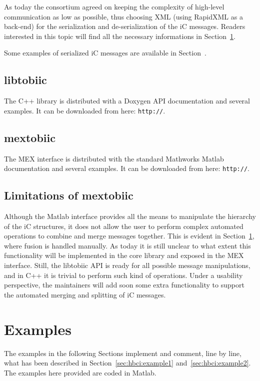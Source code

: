 \documentclass[a4paper,10pt]{article}
\begin{document}
As today the consortium agreed on keeping the complexity of high-level
communication as low as possible, thus choosing XML (using RapidXML as a
back-end) for the serialization and de-serialization of the iC messages.
Readers interested in this topic will find all the necessary informations in
Section~\ref{sec:examples}.

Some examples of serialized iC messages are available in
Section~\label{sec:code:example1}.

\subsection{libtobiic}
\label{sec:libtobiic}
The C++ library is distributed with a Doxygen API documentation and several
examples. It can be downloaded from here: \small{\texttt{http://}}.

\subsection{mextobiic}
\label{sec:mextobiic}
The MEX interface is distributed with the standard Mathworks Matlab
documentation and several examples. It can be downloaded from here:
\small{\texttt{http://}}.

\subsection{Limitations of mextobiic}
\label{sec:limitations}
Although the Matlab interface provides all the means to manipulate the hierarchy
of the iC structures, it does not allow the user to perform complex automated
operations to combine and merge messages together. 
This is evident in Section~\ref{sec:examples}, where fusion is handled manually.
As today it is still unclear to what extent this functionality will be
implemented in the core library and exposed in the MEX interface. 
Still, the libtobiic API is ready for all possible message manipulations, and in
C++ it is trivial to perform such kind of operations. Under a usability
perspective, the maintainers will add soon some extra functionality to support
the automated merging and splitting of iC messages.

\section{Examples}
\label{sec:examples}
The examples in the following Sections implement and comment, line by line, what
has been described in Section~\ref{sec:hbci:example1}
and~\ref{sec:hbci:example2}. The examples here provided are coded in Matlab.
\end{document}
